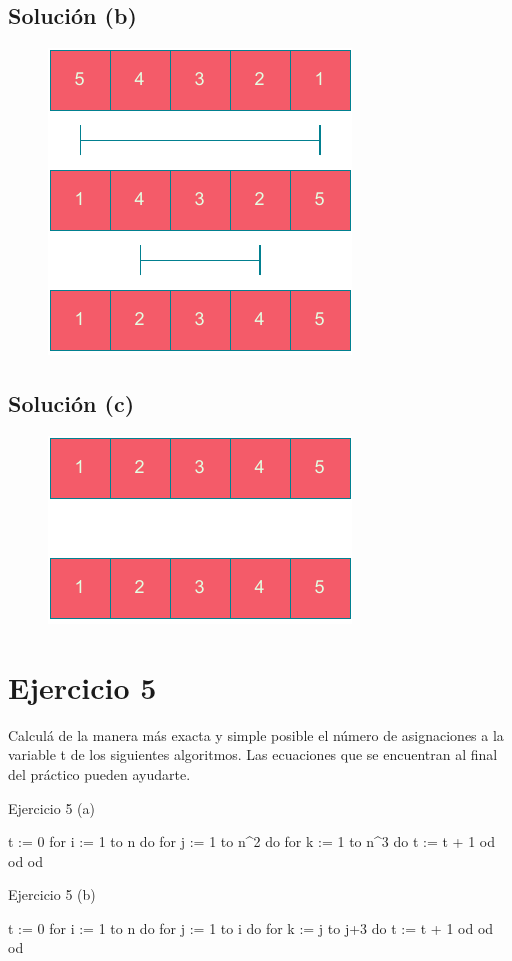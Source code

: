 \subsection{Solución (b)}
\begin{figure}[h]
    \centering
    \includegraphics[scale=0.6]{./estáticos/4b.pdf}
\end{figure}

\subsection{Solución (c)}
\begin{figure}[h]
    \centering
    \includegraphics[scale=0.6]{./estáticos/4c.pdf}
\end{figure}

\section{Ejercicio 5}
Calculá de la manera más exacta y simple posible el número de asignaciones a la variable t de los siguientes algoritmos. Las ecuaciones que se encuentran al final del práctico pueden ayudarte.
\begin{codebox}{Ejercicio 5 (a)}
\begin{pascallike}
t := 0
for i := 1 to n do
    for j := 1 to n^2 do
    for k := 1 to n^3 do
        t := t + 1
    od
    od
od
\end{pascallike}
\end{codebox}
\begin{codebox}{Ejercicio 5 (b)}
\begin{pascallike}
t := 0
for i := 1 to n do
    for j := 1 to i do
    for k := j to j+3 do
        t := t + 1
    od
    od
od
\end{pascallike}
\end{codebox}

